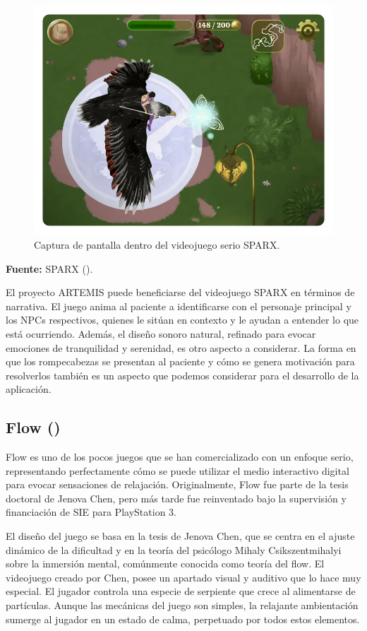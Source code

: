 \begin{figure}[h!]
	\centering
	\includegraphics[width=0.5\linewidth]{Figuras/Estado/SPARX.png}
	\caption{Captura de pantalla dentro del videojuego serio SPARX.}
	\label{fig:SPARX}
	\vspace{-30pt}
\end{figure}

\begin{center}
	\textbf{Fuente:} SPARX (\citeyear{SPARX:2013}).
\end{center}

El proyecto ARTEMIS puede beneficiarse del videojuego SPARX en términos de narrativa. El juego anima al paciente a identificarse con el personaje principal y los NPCs respectivos, quienes le sitúan en contexto y le ayudan a entender lo que está ocurriendo. Además, el diseño sonoro natural, refinado para evocar emociones de tranquilidad y serenidad, es otro aspecto a considerar. La forma en que los rompecabezas se presentan al paciente y cómo se genera motivación para resolverlos también es un aspecto que podemos considerar para el desarrollo de la aplicación.

\subsection{Flow (\cite{FLOW:2006})}

Flow es uno de los pocos juegos que se han comercializado con un enfoque serio, representando perfectamente cómo se puede utilizar el medio interactivo digital para evocar sensaciones de relajación. Originalmente, Flow fue parte de la tesis doctoral de Jenova Chen, pero más tarde fue reinventado bajo la supervisión y financiación de SIE para PlayStation 3.

El diseño del juego se basa en la tesis de Jenova Chen, que se centra en el ajuste dinámico de la dificultad y en la teoría del psicólogo Mihaly Csikszentmihalyi sobre la inmersión mental, comúnmente conocida como teoría del flow. El videojuego creado por Chen, posee un apartado visual y auditivo que lo hace muy especial. El jugador controla una especie de serpiente que crece al alimentarse de partículas. Aunque las mecánicas del juego son simples, la relajante ambientación sumerge al jugador en un estado de calma, perpetuado por todos estos elementos.

